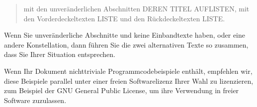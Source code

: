\bigskip
\begin{quote}
    mit den unveränderlichen Abschnitten DEREN TITEL AUFLISTEN, mit den 
    Vorderdeckeltexten LISTE und den Rückdeckeltexten LISTE.
\end{quote}
\bigskip
    
Wenn Sie unveränderliche Abschnitte und keine Einbandtexte haben, oder eine 
andere Konstellation, dann führen Sie die zwei alternativen Texte so zusammen, dass
Sie Ihrer Situation entsprechen.

Wenn Ihr Dokument nichttriviale Programmcodebeispiele enthält, empfehlen wir, 
diese Beispiele parallel unter einer freien Softwarelizenz Ihrer Wahl zu lizenzieren,
zum Beispiel der GNU General Public License, um ihre Verwendung in freier Software zuzulassen.